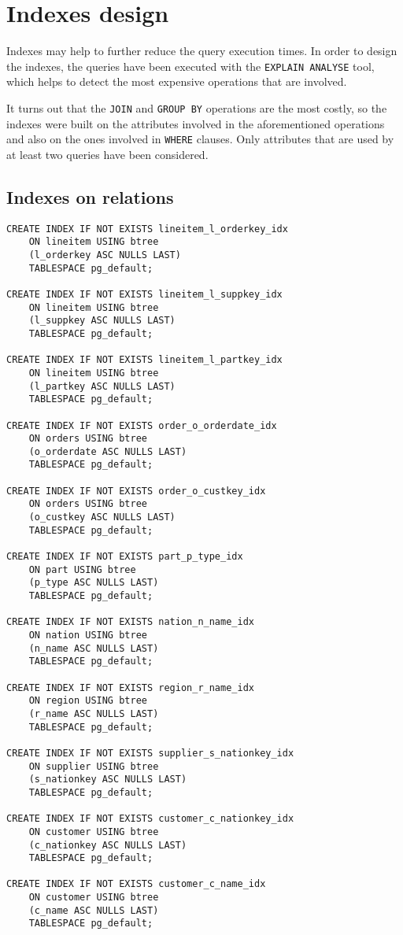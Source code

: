 

\section{Indexes design}

Indexes may help to further reduce the query execution times. In order to design the indexes, the queries have been executed with the \texttt{EXPLAIN ANALYSE} tool, which helps to detect the most expensive operations that are involved.

It turns out that the \texttt{JOIN} and \texttt{GROUP BY} operations are the most costly, so the indexes were built on the attributes involved in the aforementioned operations and also on the ones involved in \texttt{WHERE} clauses. Only attributes that are used by at least two queries have been considered.

\subsection{Indexes on relations}

\begin{lstlisting}
CREATE INDEX IF NOT EXISTS lineitem_l_orderkey_idx
    ON lineitem USING btree
    (l_orderkey ASC NULLS LAST)
    TABLESPACE pg_default;

CREATE INDEX IF NOT EXISTS lineitem_l_suppkey_idx
    ON lineitem USING btree
    (l_suppkey ASC NULLS LAST)
    TABLESPACE pg_default;
	
CREATE INDEX IF NOT EXISTS lineitem_l_partkey_idx
    ON lineitem USING btree
    (l_partkey ASC NULLS LAST)
    TABLESPACE pg_default;

CREATE INDEX IF NOT EXISTS order_o_orderdate_idx
    ON orders USING btree
    (o_orderdate ASC NULLS LAST)
    TABLESPACE pg_default;

CREATE INDEX IF NOT EXISTS order_o_custkey_idx
    ON orders USING btree
    (o_custkey ASC NULLS LAST)
    TABLESPACE pg_default;

CREATE INDEX IF NOT EXISTS part_p_type_idx
	ON part USING btree
	(p_type ASC NULLS LAST)
	TABLESPACE pg_default;

CREATE INDEX IF NOT EXISTS nation_n_name_idx
	ON nation USING btree
	(n_name ASC NULLS LAST)
	TABLESPACE pg_default;

CREATE INDEX IF NOT EXISTS region_r_name_idx
	ON region USING btree
	(r_name ASC NULLS LAST)
	TABLESPACE pg_default;

CREATE INDEX IF NOT EXISTS supplier_s_nationkey_idx
	ON supplier USING btree
	(s_nationkey ASC NULLS LAST)
	TABLESPACE pg_default;

CREATE INDEX IF NOT EXISTS customer_c_nationkey_idx
	ON customer USING btree
	(c_nationkey ASC NULLS LAST)
	TABLESPACE pg_default;

CREATE INDEX IF NOT EXISTS customer_c_name_idx
	ON customer USING btree
	(c_name ASC NULLS LAST)
	TABLESPACE pg_default;
\end{lstlisting}

